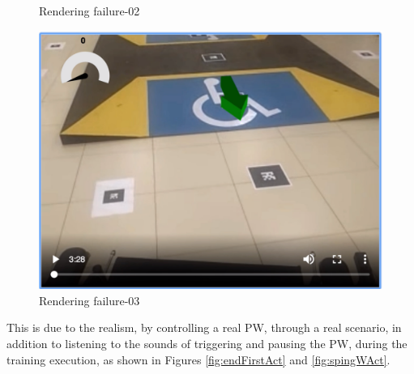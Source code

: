 \begin{figure}[!htbp]
\begin{minipage}{0.495\linewidth}
\caption{Rendering failure-02} \label{fig:errorRender02}
\end{minipage}
\begin{minipage}{0.495\linewidth}
\center
\captionsetup{justification=centering,margin=0cm,font=small}
\includegraphics[width=1\linewidth]{img/cap6/errorRender03}
\caption{Rendering failure-03} \label{fig:errorRender03}
\end{minipage}
\end{figure}

This is due to the realism, by controlling a real PW, through a real scenario, in addition to listening to the sounds of triggering and pausing the PW, during the training execution, as shown in Figures \ref{fig:endFirstAct} and \ref{fig:spingWAct}.

